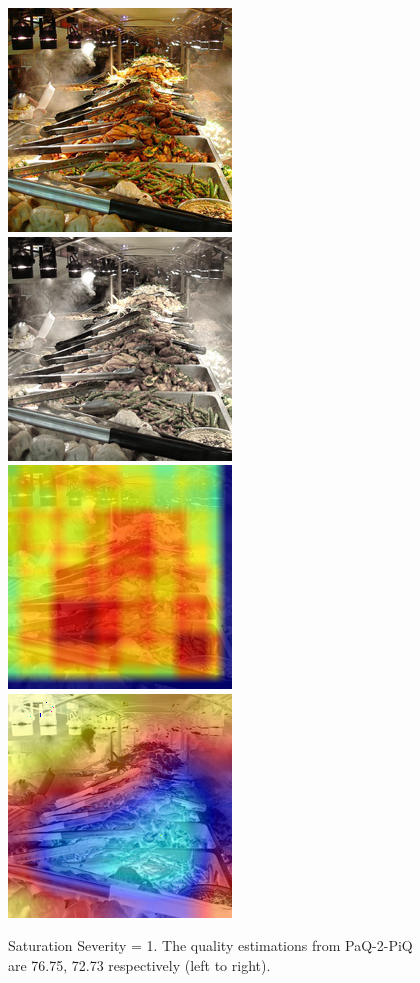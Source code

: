 \documentclass[10pt,twocolumn,letterpaper]{article}
\begin{document}
\begin{figure}[!ht]
	\includegraphics[width=.49\columnwidth]{Images/test_images/severity=0/buffet.png}\hfill
	\includegraphics[width=.49\columnwidth]{Images/test_images/severity=1/saturate/buffet.png}\hfill
	\\[\smallskipamount]
    \includegraphics[width=.49\columnwidth]{Images/saliency_maps/paq2piq/severity=1/saturate/buffet.png}\hfill
	\includegraphics[width=.49\columnwidth]{Images/saliency_maps/resnet18/severity=1/saturate/buffet.png}\hfill
	\caption{Saturation Severity = 1. The quality estimations from PaQ-2-PiQ are 76.75, 72.73 respectively (left to right).}
\end{figure}
\end{document}
